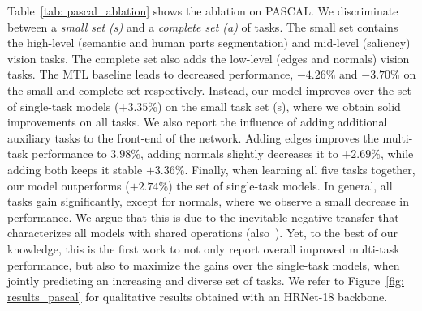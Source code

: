 \documentclass[runningheads]{llncs}
\begin{document}
Table~\ref{tab: pascal_ablation} shows the ablation on PASCAL. We discriminate between a \textit{small set (s)} and a \textit{complete set (a)} of tasks. The small set contains the high-level (semantic and human parts segmentation) and mid-level (saliency) vision tasks. The complete set also adds the low-level (edges and normals) vision tasks. The MTL baseline leads to decreased performance, $-4.26\%$ and $-3.70\%$ on the small and complete set respectively. Instead, our model improves over the set of single-task models ($+ 3.35\%$) on the small task set (s), where we obtain solid improvements on all tasks. We also report the influence of adding additional auxiliary tasks to the front-end of the network. Adding edges improves the multi-task performance to $3.98\%$, adding normals slightly decreases it to $+2.69\%$, while adding both keeps it stable $+3.36\%$. Finally, when learning all five tasks together, our model outperforms ($+2.74\%$) the set of single-task models. In general, all tasks gain significantly, except for normals, where we observe a small decrease in performance. We argue that this is due to the inevitable negative transfer that characterizes all models with shared operations (also~\cite{xu2018pad,maninis2019attentive,zhang2019pattern}). Yet, to the best of our knowledge, this is the first work to not only report overall improved multi-task performance, but also to maximize the gains over the single-task models, when jointly predicting an increasing and diverse set of tasks. We refer to Figure~\ref{fig: results_pascal} for qualitative results obtained with an HRNet-18 backbone.
\end{document}

